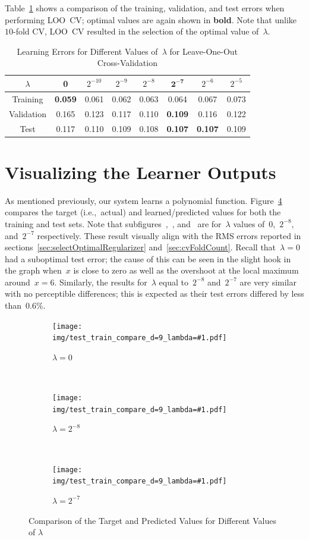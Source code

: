 \documentclass{report}
\newcommand{\includeLambdaPlot}[3]{  
\begin{subfigure}[t]{#2}
  \centering
  \texttt{[image: img/test\_train\_compare\_d=9\_lambda=\#1.pdf]}
  \caption{$\lambda=#1$}\label{#3}
\end{subfigure}}
\begin{document}
  Table~\ref{tab:lambdaLooError} shows a comparison of the training, validation, and test errors when performing LOO~CV; optimal values are again shown in \textbf{bold}.  Note that unlike $10$-fold CV, LOO~CV resulted in the selection of the optimal value of~$\lambda$.
  
   \begin{table}[tb]
    \centering
    \caption{Learning Errors for Different Values of~$\lambda$ for Leave-One-Out Cross-Validation}\label{tab:lambdaLooError}
    \begin{tabular}{c||c|c|c|c|c|c|c}
      \hline
      $\lambda$  & 0     & $2^{-10}$ & $2^{-9}$ & $2^{-8}$ & $\mathbf{2^{-7}}$ & $2^{-6}$ & $2^{-5}$ \\ \hline\hline
      Training   & \textbf{0.059} & 0.061      & 0.062     & 0.063     & 0.064          & 0.067    & 0.073   \\ \hline
      Validation & 0.165          & 0.123      & 0.117     & 0.110     & \textbf{0.109} & 0.116    & 0.122   \\ \hline
      Test       & 0.117          & 0.110      & 0.109     & 0.108     & \textbf{0.107} & \textbf{0.107}    & 0.109   \\ \hline
    \end{tabular}
  \end{table}

  
  \section{Visualizing the Learner Outputs}
  
  As mentioned previously, our system learns a polynomial function.  Figure~\ref{fig:learnerTargetAndPredicted} compares the target (i.e.,~actual) and learned/predicted values for both the training and test sets.  Note that subfigures~,~, and~ are for~$\lambda$ values of~$0$,~$2^{-8}$, and~$2^{-7}$ respectively.  These result visually align with the RMS errors reported in sections~\ref{sec:selectOptimalRegularizer} and~\ref{sec:cvFoldCount}.  Recall that~${\lambda=0}$ had a suboptimal test error; the cause of this can be seen in the slight hook in the graph when~$x$ is close to zero as well as the overshoot at the local maximum around~${x=6}$.  Similarly, the results for~$\lambda$ equal to~$2^{-8}$ and~$2^{-7}$ are very similar with no perceptible differences; this is expected as their test errors differed by less than~$0.6\%$.
  
  \begin{figure}[b]
    \centering
    \includeLambdaPlot{0}{0.3\textwidth}{fig:learnedZeroLambda}
    ~ 
    \includeLambdaPlot{2^{-8}}{0.3\textwidth}{fig:learnedTwoPowN8Lambda}
    ~
    \includeLambdaPlot{2^{-7}}{0.3\textwidth}{fig:learnedTwoPowN7Lambda}
    \caption{Comparison of the Target and Predicted Values for Different Values of $\lambda$}\label{fig:learnerTargetAndPredicted}
  \end{figure}
\end{document}
